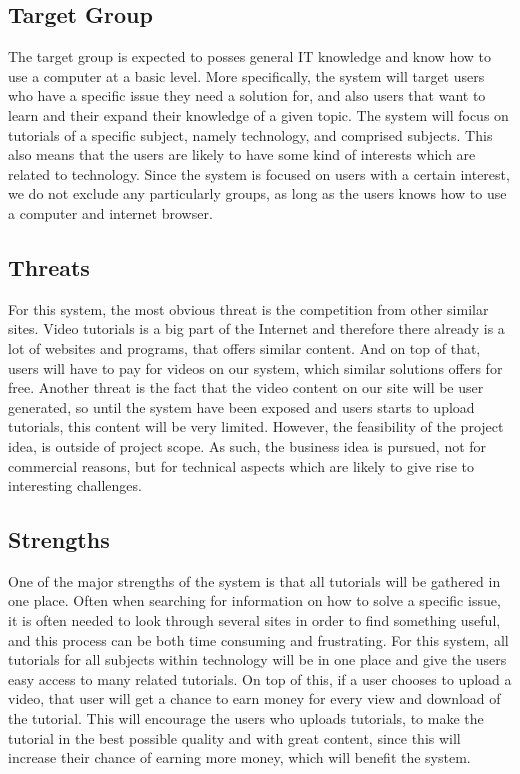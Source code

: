\subsection{Target Group}
The target group is expected to posses general IT knowledge and know how to use a computer at a basic level. More specifically, the system will target users who have a specific issue they need a solution for, and also users that want to learn and their expand their knowledge of a given topic. The system will focus on tutorials of a specific subject, namely technology, and comprised subjects. This also means that the users are likely to have some kind of interests which are related to technology. Since the system is focused on users with a certain interest, we do not exclude any particularly groups, as long as the users knows how to use a computer and internet browser.  

\subsection{Threats}
For this system, the most obvious threat is the competition from other similar sites. Video tutorials is a big part of the Internet and therefore there already is a lot of websites and programs, that offers similar content. And on top of that, users will have to pay for videos on our system, which similar solutions offers for free. Another threat is the fact that the video content on our site will be user generated, so until the system have been exposed and users starts to upload tutorials, this content will be very limited. However, the feasibility of the project idea, is outside of project scope. As such, the business idea is pursued, not for commercial reasons, but for technical aspects which are likely to give rise to interesting challenges.

\subsection{Strengths} \label{Strengths}
One of the major strengths of the system is that all tutorials will be gathered in one place. Often when searching for information on how to solve a specific issue, it is often needed to look through several sites in order to find something useful, and this process can be both time consuming and frustrating. For this system, all tutorials for all subjects within technology will be in one place and give the users easy access to many related tutorials. On top of this, if a user chooses to upload a video, that user will get a chance to earn money for every view and download of the tutorial. This will encourage the users who uploads tutorials, to make the tutorial in the best possible quality and with great content, since this will increase their chance of earning more money, which will benefit the system.\\

